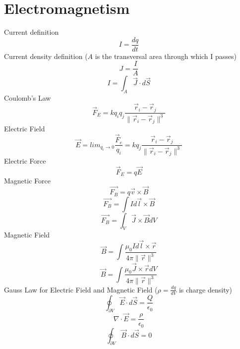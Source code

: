 \documentclass{article}
\begin{document}
\section{Electromagnetism}
Current definition
\begin{equation}
  I = \frac{dq}{dt}
\end{equation}
Current density definition ($A$ is the transversal area through which I passes)
\begin{equation}
  J = \frac{I}{A}
\end{equation}
\begin{equation}
  I = \int_{A} \vec{J} \cdot d\vec{S}
\end{equation}
Coulomb's Law
\begin{equation}
    \vec{F}_E = kq_iq_j\frac{\vec{r}_i - \vec{r}_j}{\|\vec{r}_i - \vec{r}_j\|^3}
\end{equation}
Electric Field
\begin{equation}
  \vec{E} = lim_{q_i \to 0} \frac{\vec{F}_e}{q_i} = kq_j\frac{\vec{r}_i - \vec{r}_j}{\|\vec{r}_i - \vec{r}_j\|^3}
\end{equation}
Electric Force
\begin{equation}
  \vec{F}_E = q\vec{E}
\end{equation}
Magnetic Force
\begin{equation}
  \vec{F_B} = q\vec{v} \times \vec{B}
\end{equation}
\begin{equation}
  \vec{F_B} = \int Id\vec{l} \times \vec{B}
\end{equation}
\begin{equation}
  \vec{F_B} = \int_{V} \vec{J} \times \vec{B} dV
\end{equation}
Magnetic Field
\begin{equation}
  \vec{B} = \int \frac{\mu_0Id\vec{l} \times \vec{r}}{4\pi\|\vec{r}\|^3}
\end{equation}
\begin{equation}
  \vec{B} = \int \frac{\mu_0\vec{J} \times \vec{r} dV}{4\pi\|\vec{r}\|^3}
\end{equation}
Gauss Law for Electric Field and Magnetic Field ($\rho = \frac{dq}{dV}$ is charge density)
\begin{equation}
  \oint_{\partial V}\vec{E} \cdot d\vec{S} = \frac{Q}{\epsilon_0}
\end{equation}
\begin{equation}
  \nabla \cdot \vec{E} = \frac{\rho}{\epsilon_0}
\end{equation}
\begin{equation}
  \oint_{\partial V}\vec{B} \cdot d\vec{S} = 0
\end{equation}
\end{document}

